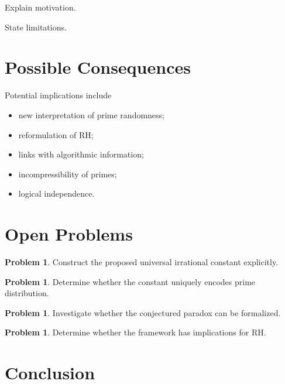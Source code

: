 \documentclass[11pt]{article}
\theoremstyle{definition}
\newtheorem{problem}[theorem]{Problem}
\theoremstyle{remark}
\begin{document}
Explain motivation.

State limitations.

\section{Possible Consequences}

Potential implications include

\begin{itemize}
\item new interpretation of prime randomness;
\item reformulation of RH;
\item links with algorithmic information;
\item incompressibility of primes;
\item logical independence.
\end{itemize}

\section{Open Problems}

\begin{problem}

Construct the proposed universal irrational constant explicitly.

\end{problem}

\begin{problem}

Determine whether the constant uniquely encodes prime distribution.

\end{problem}

\begin{problem}

Investigate whether the conjectured paradox can be formalized.

\end{problem}

\begin{problem}

Determine whether the framework has implications for RH.

\end{problem}

\section{Conclusion}
\end{document}
